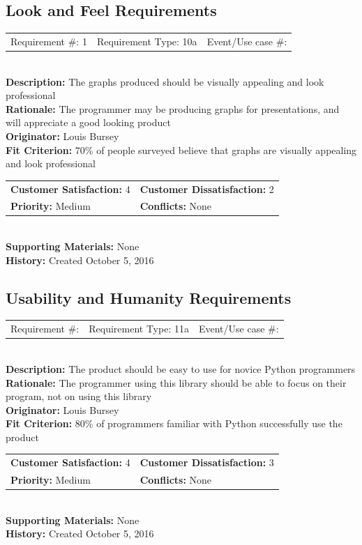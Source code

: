 \documentclass[12pt, titlepage]{article}
\begin{document}
\subsection{Look and Feel Requirements}
%
%
\begin{reqbox}
\begin{tabular}{ccc}
Requirement \#: 1& Requirement Type: 10a & Event/Use case \#: \\
\end{tabular} \\
\textbf{Description:} The graphs produced should be visually appealing and look professional \\
\textbf{Rationale:} The programmer may be producing graphs for presentations, and will appreciate a good looking product \\
\textbf{Originator:} Louis Bursey\\
\textbf{Fit Criterion:} 70\% of people surveyed believe that graphs are visually appealing and look professional  \\
\begin{tabular}{ll}
\textbf{Customer Satisfaction:} 4 & \textbf{Customer Dissatisfaction:} 2 \\
\textbf{Priority:} Medium & \textbf{Conflicts:} None\\
\end{tabular} \\
\textbf{Supporting Materials:} None \\
\textbf{History:} Created October 5, 2016
\end{reqbox}
%
%
\subsection{Usability and Humanity Requirements}

%
%
\begin{reqbox}
\begin{tabular}{ccc}
Requirement \#: & Requirement Type: 11a & Event/Use case \#: \\
\end{tabular} \\
\textbf{Description:} The product should be easy to use for novice Python programmers \\
\textbf{Rationale:} The programmer using this library should be able to focus on their program, not on using this library \\
\textbf{Originator:} Louis Bursey\\
\textbf{Fit Criterion:} 80\% of programmers familiar with Python successfully use the product  \\
\begin{tabular}{ll}
\textbf{Customer Satisfaction:} 4 & \textbf{Customer Dissatisfaction:} 3 \\
\textbf{Priority:} Medium & \textbf{Conflicts:} None\\
\end{tabular} \\
\textbf{Supporting Materials:} None \\
\textbf{History:} Created October 5, 2016
\end{reqbox}
\end{document}
